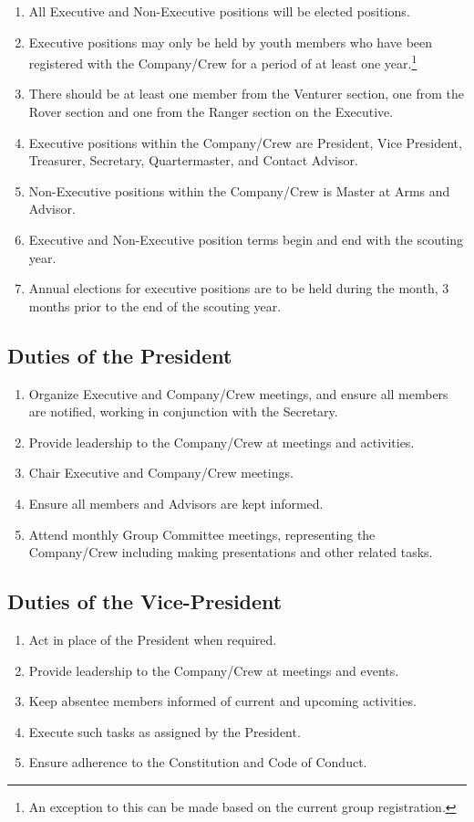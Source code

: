 \begin{enumerate}
    \item All Executive and Non-Executive positions will be elected positions.
    \item Executive positions may only be held by youth members who have been registered with the Company/Crew for a period of at least one year.\footnote{An exception to this can be made based on the current group registration.}
    \item There should be at least one member from the Venturer section, one from the Rover section and one from the Ranger section on the Executive.\footnotemark[\value{footnote}]
    \item Executive positions within the Company/Crew are President, Vice President, Treasurer, Secretary, Quartermaster, and Contact Advisor.
    \item Non-Executive positions within the Company/Crew is Master at Arms and Advisor.
    \item Executive and Non-Executive position terms begin and end with the scouting year.
    \item Annual elections for executive positions are to be held during the month, 3 months prior to the end of the scouting year.
\end{enumerate}

\subsection{Duties of the President}\label{subsec:duties-of-the-president}
\begin{enumerate}
    \item Organize Executive and Company/Crew meetings, and ensure all members are notified, working in conjunction with the Secretary.
    \item Provide leadership to the Company/Crew at meetings and activities.
    \item Chair Executive and Company/Crew meetings.
    \item Ensure all members and Advisors are kept informed.
    \item Attend monthly Group Committee meetings, representing the Company/Crew including making presentations and other related tasks.
\end{enumerate}

\subsection{Duties of the Vice-President}\label{subsec:duties-of-the-vice-president}
\begin{enumerate}
    \item Act in place of the President when required.
    \item Provide leadership to the Company/Crew at meetings and events.
    \item Keep absentee members informed of current and upcoming activities.
    \item Execute such tasks as assigned by the President.
    \item Ensure adherence to the Constitution and Code of Conduct.
\end{enumerate}

